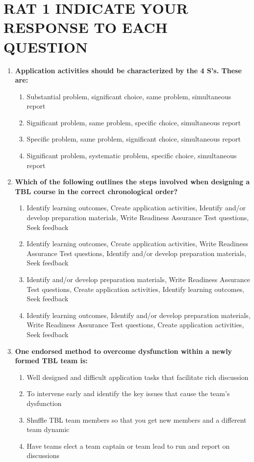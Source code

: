 \documentclass[twoside=false,DIV=14]{scrartcl}
\begin{document}
\part*{RAT 1 \hspace{6em} {\small INDICATE YOUR RESPONSE TO EACH QUESTION}}
\renewcommand{\labelenumii}{\alph{enumii}) $\square$}
\begin{enumerate}
\item \textbf{Application activities should be characterized by the 4 S's. These are:}
\begin{enumerate}
    \item Substantial problem, significant choice, same problem, simultaneous report
    \item Significant problem, same problem, specific choice, simultaneous report
    \item Specific problem, same problem, significant choice, simultaneous report
    \item Significant problem, systematic problem, specific choice, simultaneous report
\end{enumerate}

\item \textbf{Which of the following outlines the steps involved when designing a TBL course in the correct chronological order?}
\begin{enumerate}
    \item Identify learning outcomes, Create application activities, Identify and/or develop preparation materials, Write Readiness Assurance Test questions, Seek feedback
    \item Identify learning outcomes, Create application activities, Write Readiness Assurance Test questions, Identify and/or develop preparation materials, Seek feedback
    \item Identify and/or develop preparation materials, Write Readiness Assurance Test questions, Create application activities, Identify learning outcomes, Seek feedback
    \item Identify learning outcomes, Identify and/or develop preparation materials, Write Readiness Assurance Test questions, Create application activities, Seek feedback
\end{enumerate}

\item \textbf{One endorsed method to overcome dysfunction within a newly formed TBL team is:}
\begin{enumerate}
    \item Well designed and difficult application tasks that facilitate rich discussion
    \item To intervene early and identify the key issues that cause the team’s dysfunction
    \item Shuffle TBL team members so that you get new members and a different team dynamic
    \item Have teams elect a team captain or team lead to run and report on discussions
\end{enumerate}


\end{enumerate}
\end{document}
